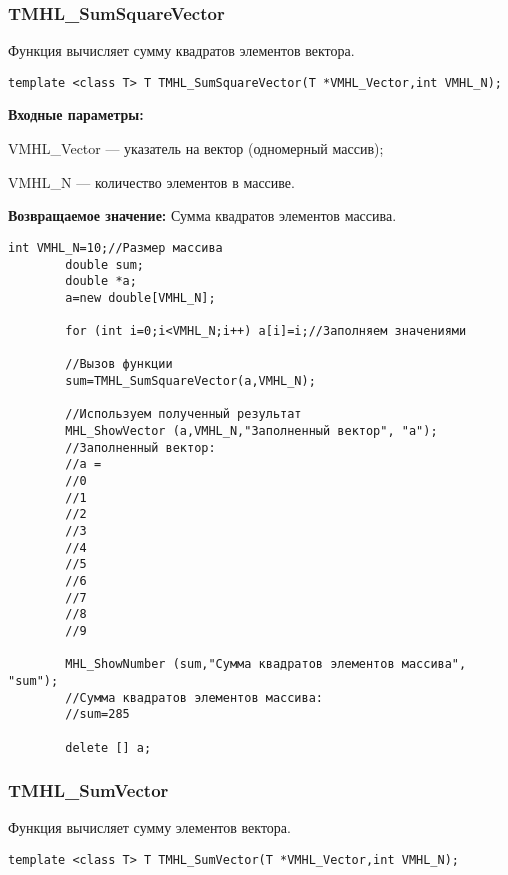 \documentclass[a4paper,12pt]{article}
\begin{document}
\subsubsection{TMHL\_SumSquareVector}\label{TMHL_SumSquareVector}

Функция вычисляет сумму квадратов элементов вектора.


\begin{lstlisting}[label=code_syntax_TMHL_SumSquareVector,caption=Синтаксис]
template <class T> T TMHL_SumSquareVector(T *VMHL_Vector,int VMHL_N);
\end{lstlisting}

\textbf{Входные параметры:}

 VMHL\_Vector --- указатель на вектор (одномерный массив);
 
 VMHL\_N --- количество элементов в массиве.

\textbf{Возвращаемое значение:}
Сумма квадратов элементов массива.


\begin{lstlisting}[label=code_use_TMHL_SumSquareVector,caption=Пример использования]
        int VMHL_N=10;//Размер массива
        double sum;
        double *a;
        a=new double[VMHL_N];

        for (int i=0;i<VMHL_N;i++) a[i]=i;//Заполняем значениями

        //Вызов функции
        sum=TMHL_SumSquareVector(a,VMHL_N);

        //Используем полученный результат
        MHL_ShowVector (a,VMHL_N,"Заполненный вектор", "a");
        //Заполненный вектор:
        //a =
        //0
        //1
        //2
        //3
        //4
        //5
        //6
        //7
        //8
        //9

        MHL_ShowNumber (sum,"Сумма квадратов элементов массива", "sum");
        //Сумма квадратов элементов массива:
        //sum=285

        delete [] a;
\end{lstlisting}

\subsubsection{TMHL\_SumVector}\label{TMHL_SumVector}

Функция вычисляет сумму элементов вектора.


\begin{lstlisting}[label=code_syntax_TMHL_SumVector,caption=Синтаксис]
template <class T> T TMHL_SumVector(T *VMHL_Vector,int VMHL_N);
\end{lstlisting}
\end{document}
